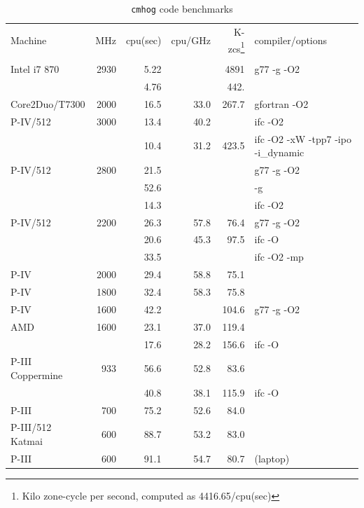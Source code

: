 \documentclass[10pt,dvips]{article}
\begin{document}
\begin{table}[htbp]
\centering
\medskip
\caption{{\tt cmhog} code benchmarks}
\begin{tabular}{|l|r|r|r|r|l|} \hline
Machine & MHz  	      
	& cpu(sec) 
	& cpu/GHz 
	& K-zcs\footnote{Kilo zone-cycle per second, computed as 4416.65/cpu(sec)}
	& compiler/options \\ 
&&&&&  \\ \hline
Intel i7 870    & 2930  &         5.22 &      & 4891  & g77 -g -O2 \\ %
                &       &         4.76 &      & 442.  & \\
Core2Duo/T7300  & 2000  &        16.5 & 33.0  & 267.7 & gfortran -O2 \\  %
P-IV/512        & 3000  &        13.4 & 40.2  &       & ifc -O2 \\  %
                &       &        10.4 & 31.2  & 423.5 & ifc -O2 -xW -tpp7 -ipo -i\_dynamic \\
P-IV/512	& 2800	&	 21.5 &       &       & g77 -g -O2 \\  %
                &       &        52.6 &       &       & -g \\
                &       &        14.3 &       &       & ifc -O2 \\    
P-IV/512	& 2200	&	 26.3 & 57.8  &  76.4 & g77 -g -O2 \\  %
                &       &        20.6 & 45.3  &  97.5 & ifc -O \\
		&       &        33.5 &       &       & ifc -O2 -mp \\
P-IV		& 2000  &	 29.4 & 58.8  &  75.1 &  \\  %
P-IV		& 1800  &	 32.4 & 58.3  &  75.8 &  \\  %
P-IV            & 1600  &        42.2 &       & 104.6 & g77 -g -O2 \\ %
AMD 		& 1600  &        23.1 & 37.0  & 119.4 & \\ %
                &       &        17.6 & 28.2  & 156.6 & ifc -O \\
P-III Coppermine & 933   &	 56.6 & 52.8  &  83.6 & \\ %
                 &       &       40.8 & 38.1  & 115.9 & ifc -O \\
P-III		& 700   &	 75.2 & 52.6  &  84.0 & \\ %
P-III/512 Katmai & 600	&	 88.7 & 53.2  &  83.0 &  \\ %
P-III		& 600	&	 91.1 & 54.7  &  80.7 & (laptop) \\ %

\end{tabular}
\end{table}
\end{document}
